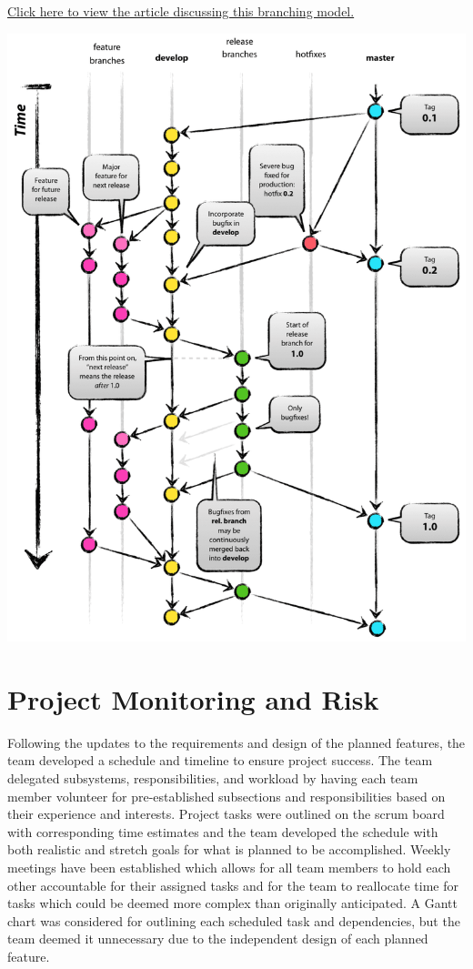 \documentclass{scrreprt}
\begin{document}
\href{http://nvie.com/posts/a-successful-git-branching-model/}{Click here to view the article discussing this branching model.}

\includegraphics[width=\textwidth,height=0.8\textheight,keepaspectratio]{branchingmodel.png}

\chapter{Project Monitoring and Risk}

Following the updates to the requirements and design of the planned features, the team developed a schedule and timeline to ensure project success. The team delegated subsystems, responsibilities, and workload by having each team member volunteer for pre-established subsections and responsibilities based on their experience and interests. Project tasks were outlined on the scrum board with corresponding time estimates and the team developed the schedule with both realistic and stretch goals for what is planned to be accomplished. Weekly meetings have been established which allows for all team members to hold each other accountable for their assigned tasks and for the team to reallocate time for tasks which could be deemed more complex than originally anticipated. A Gantt chart was considered for outlining each scheduled task and dependencies, but the team deemed it unnecessary due to the independent design of each planned feature.
\end{document}
